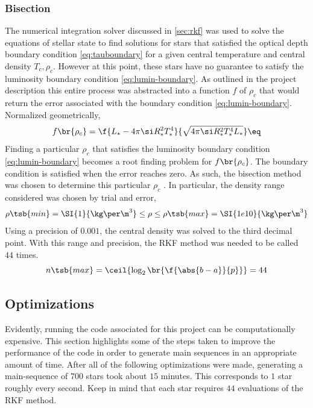 \documentclass[11pt]{article}
\begin{document}
    \subsubsection{Bisection}
    The numerical integration solver discussed in \ref{sec:rkf} was used to solve the equations of stellar state to find solutions for stars that satisfied the optical depth boundary condition \eqref{eq:tauboundary} for a given central temperature and central density $T_c, \rho_c$. However at this point, these stars have no guarantee to satisfy the luminosity boundary condition \eqref{eq:lumin-boundary}. As outlined in the project description \cite{projectdesciption} this entire process was abstracted into a function $f$ of $\rho_c$ that would return the error associated with the boundary condition \eqref{eq:lumin-boundary}. Normalized geometrically,
    \[ f\br{\rho_c} = \f{L_* - 4 \pi \si R_*^2 T_*^4}{\sqrt{4 \pi \si R_*^2 T_*^4L_*}} \eq \label{eq:errorcondition} \]
    Finding a particular $\rho_c$ that satisfies the luminosity boundary condition \eqref{eq:lumin-boundary} becomes a root finding problem for $f\br{\rho_c}$. The boundary condition is satisfied when the error reaches zero. As such, the bisection method was chosen to determine this particular $\rho_c$ \cite{bisection}. In particular, the density range considered was chosen by trial and error,
    \[ \rho\tsb{min} = \SI{1}{\kg\per\m^3} \leq \rho \leq \rho\tsb{max} = \SI{1e10}{\kg\per\m^3}  \]
    Using a precision of $0.001$, the central density was solved to the third decimal point. With this range and precision, the RKF method was needed to be called $44$ times.
    \[ n\tsb{max} = \ceil{\log_2\br{\f{\abs{b-a}}{p}}} = 44 \]
    \subsection{Optimizations}
    Evidently, running the code associated for this project can be computationally expensive. This section highlights some of the steps taken to improve the performance of the code in order to generate main sequences in an appropriate amount of time. After all of the following optimizations were made, generating a main-sequence of $700$ stars took about $15$ minutes. This corresponds to $1$ star roughly every second. Keep in mind that each star requires $44$ evaluations of the RKF method.
\end{document}
